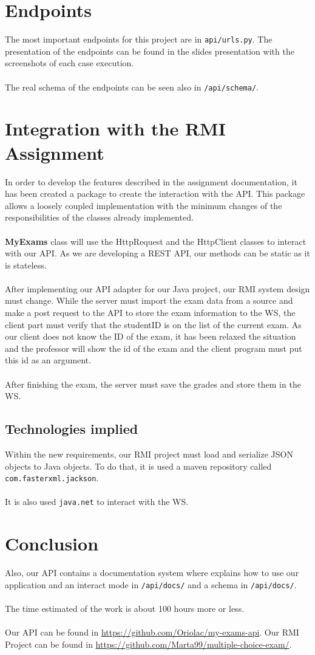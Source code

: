 \documentclass{article}
\begin{document}
\section{Endpoints}
The most important endpoints for this project are in \texttt{api/urls.py}. The presentation of the endpoints can be found in the slides presentation with the screenshots of each case execution.
\\
\\
The real schema of the endpoints can be seen also in \texttt{/api/schema/}.
\section{Integration with the RMI Assignment}
In order to develop the features described in the assignment documentation, it has been created a package to create the interaction with the API. This package allows a loosely coupled implementation with the minimum changes of the responsibilities of the classes already implemented.
\\\\
\textbf{MyExams }class will use the HttpRequest and the HttpClient classes to interact with our API. As we are developing a REST API, our methods can be static as it is stateless.
\\\\
After implementing our API adapter for our Java project, our RMI system design must change. While the server must import the exam data from a source and make a post request to the API to store the exam information to the WS, the client part must verify that the studentID is on the list of the current exam. As our client does not know the ID of the exam, it has been relaxed the situation and the professor will show the id of the exam and the client program must put this id as an argument.
\\
\\
After finishing the exam, the server must save the grades and store them in the WS.
\subsection{Technologies implied}
Within the new requirements, our RMI project must load and serialize JSON objects to Java objects. To do that, it is used a maven repository called \texttt{com.fasterxml.jackson}.
\\
\\
It is also used \texttt{java.net} to interact with the WS.
\section{Conclusion}
Also, our API contains a documentation system where explains how to use our application and an interact mode in \texttt{/api/docs/} and a schema in \texttt{/api/docs/}.\\\\
The time estimated of the work is about 100 hours more or less.\\\\
Our API can be found in \url{https://github.com/Oriolac/my-exams-api}. Our RMI Project can be found in \url{https://github.com/Marta99/multiple-choice-exam/}.
\end{document}
